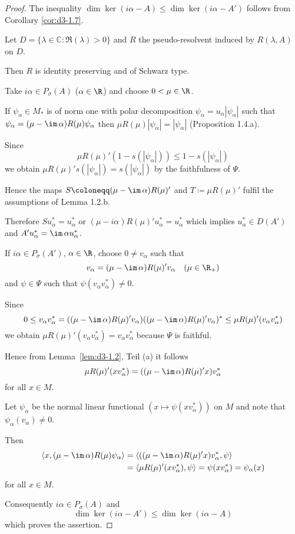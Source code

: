 \begin{proof}
The inequality $\dim \ker(i\alpha - A) \leq \dim \ker(i\alpha - A')$ follows from Corollary \ref{cor:d3-1.7}.

Let $D = \{\lambda \in \mathbb{C} \colon \Re(\lambda) > 0\}$ and $R$ the pseudo-resolvent induced by $R(\lambda,A)$ on $D$.

Then $R$ is identity preserving and of Schwarz type.

Take $i\alpha \in P_{\sigma}(A)$ ($\alpha \in \R$) and choose $0 < \mu \in \R$.

If $\psi_{\alpha} \in M_{*}$ is of norm one with polar decomposition $\psi_{\alpha} = u_{\alpha}|\psi_{\alpha}|$ such that $\psi_{\alpha} = (\mu - \im\,\alpha)R(\mu)\psi_{\alpha}$ then $\mu R(\mu)|\psi_{\alpha}| = |\psi_{\alpha}|$ (Proposition 1.4.a).

Since
\[
\mu R(\mu)'(1 - s(|\psi_{\alpha}|)) \leq 1 - s(|\psi_{\alpha}|)
\]
we obtain $\mu R(\mu)'s(|\psi_{\alpha}|) = s(|\psi_{\alpha}|)$ by the faithfulness of $\Psi$.

Hence the maps $S \coloneqq (\mu - \im\,\alpha)R(\mu)'$ and $T \coloneqq \mu R(\mu)'$ fulfil the assumptions of Lemma 1.2.b.

Therefore $Su_{\alpha}^{*} = u_{\alpha}^{*}$ or $(\mu-i\alpha)R(\mu)'u_{\alpha}^{*} = u_{\alpha}^{*}$ which implies $u_{\alpha}^{*} \in D(A')$ and $A'u_{\alpha}^{*} = \im\,\alpha u_{\alpha}^{*}$.

If $i\alpha \in P_{\sigma}(A')$, $\alpha \in \R$, choose $0 \neq v_{\alpha}$ such that
\[
v_{\alpha} = (\mu - \im\,\alpha)R(\mu)'v_{\alpha} \quad (\mu \in \R_{+})
\]
and $\psi \in \Psi$ such that $\psi(v_{\alpha}v_{\alpha}^{*}) \neq 0$.

Since
\[
0 \leq v_{\alpha}v_{\alpha}^{*} = ((\mu - \im\,\alpha)R(\mu)'v_{\alpha})((\mu - \im\,\alpha)R(\mu)'v_{\alpha})^{*} \leq \mu R(\mu)'(v_{\alpha}v_{\alpha}^{*})
\]
we obtain $\mu R(\mu)'(v_{\alpha}v_{\alpha}^{*}) = v_{\alpha}v_{\alpha}^{*}$ because $\Psi$ is faithful.


Hence from Lemma~\ref{lem:d3-1.2}, Teil (a) it follows
\[
\mu R(\mu)'(xv_{\alpha}^{*}) = ((\mu - \im\,\alpha)R(\mu)'x)v_{\alpha}^{*}
\]
for all $x \in M$.

Let $\psi_{\alpha}$ be the normal linear functional $(x \mapsto \psi(xv_{\alpha}^{*}))$ on $M$ and note that $\psi_{\alpha}(v_{\alpha}) \neq 0$.

Then
\begin{align*}
\langle x, (\mu - \im\,\alpha)R(\mu)\psi_{\alpha} \rangle &= \langle ((\mu - \im\,\alpha)R(\mu)'x)v_{\alpha}^{*},\psi \rangle \\
&= \langle \mu R(\mu)'(xv_{\alpha}^{*}),\psi \rangle = \psi(xv_{\alpha}^{*}) = \psi_{\alpha}(x)
\end{align*}
for all $x \in M$.

Consequently $i\alpha \in P_{\sigma}(A)$ and
\[
\dim \ker(i\alpha - A') \leq \dim \ker(i\alpha - A)
\]
which proves the assertion.
\end{proof}

